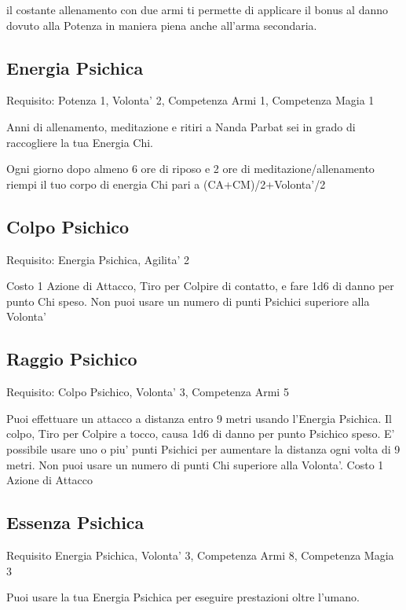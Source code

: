 \documentclass[a4paper,11pt,twoside,openany]{book}
\begin{document}
	il costante allenamento con due armi ti permette di applicare il bonus al danno dovuto alla Potenza in maniera piena anche all'arma secondaria. 
	
	\subsection{Energia Psichica}
	
	Requisito: Potenza 1, Volonta' 2, Competenza Armi 1, Competenza Magia
	1
	
	Anni di allenamento, meditazione e ritiri a Nanda Parbat sei in grado di raccogliere la tua Energia Chi.
	
	Ogni giorno dopo almeno 6 ore di riposo e 2 ore di meditazione/allenamento riempi il tuo corpo di energia Chi pari a (CA+CM)/2+Volonta'/2
	
	\subsection{Colpo Psichico}
	
	Requisito: Energia Psichica, Agilita' 2
	
	Costo 1 Azione di Attacco, Tiro per Colpire di contatto, e fare 1d6 di danno per punto Chi speso. Non puoi usare un numero di punti Psichici superiore alla Volonta'
	
	\subsection{Raggio Psichico}
	
	Requisito: Colpo Psichico, Volonta' 3, Competenza Armi 5
	
	Puoi effettuare un attacco a distanza entro 9 metri usando l'Energia Psichica. Il colpo, Tiro per Colpire a tocco, causa 1d6 di danno per punto Psichico speso. E' possibile usare uno o piu' punti Psichici per aumentare la distanza ogni volta di 9 metri. Non puoi usare un numero di punti Chi superiore alla Volonta'. Costo 1 Azione di Attacco
	
	\subsection{Essenza Psichica}
	
	Requisito Energia Psichica, Volonta' 3, Competenza Armi 8, Competenza
	Magia 3
	
	Puoi usare la tua Energia Psichica per eseguire prestazioni oltre
	l'umano.
	
\end{document}
